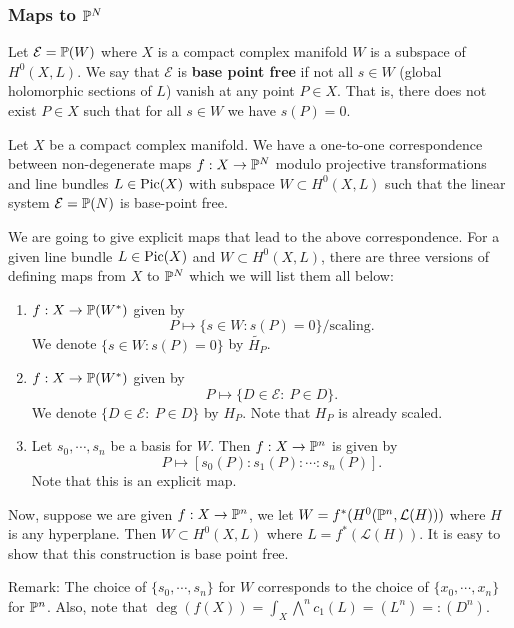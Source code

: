 \subsubsection{Maps to ${\mathbb P}^N$}
\begin{definition}
Let $\mathcal{E}={\mathbb P}(W)$ where $X$ is a compact complex manifold $W$ is a subspace of $H^0(X,L)$. We say that $\mathcal{E}$ is \textbf{base point free} if not all $s\in W$ (global holomorphic sections of $L$) vanish at any point $P\in X$. That is, there does not exist $P\in X$ such that for all $s\in W$ we have $s(P)=0$. 
\end{definition}

Let $X$ be a compact complex manifold. We have a one-to-one correspondence between non-degenerate maps $f:X\to {\mathbb P}^N$ modulo projective transformations and line bundles $L\in \operatorname{Pic}(X)$ with subspace $W\subset H^0(X,L)$ such that the linear system $\mathcal{E}={\mathbb P}(N)$ is base-point free. 

We are going to give explicit maps that lead to the above correspondence. For a given line bundle $L\in \operatorname{Pic}(X)$ and $W\subset H^0(X,L)$, there are three versions of defining maps from $X$ to ${\mathbb P}^N$ which we will list them all below:

\begin{enumerate}
\item $f:X\to {\mathbb P}(W^*)$ given by 
$$P\mapsto \{s\in W: s(P)=0\}/\text{scaling}.$$
We denote $\{s\in W: s(P)=0\}$ by $\tilde{H_P}$. 
\item $f:X\to {\mathbb P}(W^*)$ given by
$$P\mapsto \{D\in \mathcal{E}:\ P\in D\}.$$
We denote $\{D\in \mathcal{E}:\ P\in D\}$ by $H_P$. Note that $H_P$ is already scaled.
\item Let $s_0,\cdots, s_n$ be a basis for $W$. Then $f:X\to {\mathbb P}^n$ is given by
$$P\mapsto [s_0(P):s_1(P):\cdots:s_n(P)].$$
Note that this is an explicit map. 
\end{enumerate}

Now, suppose we are given $f:X\to {\mathbb P}^n$, we let $W=f^*(H^0({\mathbb P}^n,\mathcal{L}(H)))$ where $H$ is any hyperplane. Then $W\subset H^0(X,L)$ where $L=f^*(\mathcal{L}(H))$. It is easy to show that this construction is base point free. 

Remark: The choice of $\{s_0,\cdots, s_n\}$ for $W$ corresponds to the choice of $\{x_0,\cdots,x_n\}$ for ${\mathbb P}^n$. Also, note that $\deg(f(X))=\int_X \bigwedge^n c_1(L)=(L^n)=:(D^n)$. 
